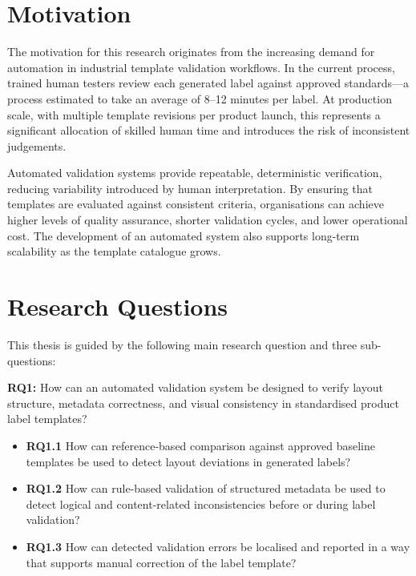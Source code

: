 \section{Motivation}
\label{sec:motivation}

The motivation for this research originates from the increasing demand for automation in
industrial template validation workflows. In the current process, trained human testers
review each generated label against approved standards—a process estimated to take an
average of 8–12 minutes per label. At production scale, with multiple template revisions
per product launch, this represents a significant allocation of skilled human time and
introduces the risk of inconsistent judgements.

Automated validation systems provide repeatable, deterministic verification, reducing
variability introduced by human interpretation. By ensuring that templates are evaluated
against consistent criteria, organisations can achieve higher levels of quality assurance,
shorter validation cycles, and lower operational cost. The development of an automated
system also supports long-term scalability as the template catalogue grows.

\section{Research Questions}
\label{sec:rqs}

This thesis is guided by the following main research question and three sub-questions:

\begin{tcolorbox}[title=Main Research Question]
\textbf{RQ1:} How can an automated validation system be designed to verify layout
structure, metadata correctness, and visual consistency in standardised product label
templates?
\end{tcolorbox}

\begin{itemize}
  \item \textbf{RQ1.1} How can reference-based comparison against approved baseline
  templates be used to detect layout deviations in generated labels?

  \item \textbf{RQ1.2} How can rule-based validation of structured metadata be used to
  detect logical and content-related inconsistencies before or during label validation?

  \item \textbf{RQ1.3} How can detected validation errors be localised and reported in a
  way that supports manual correction of the label template?
\end{itemize}

